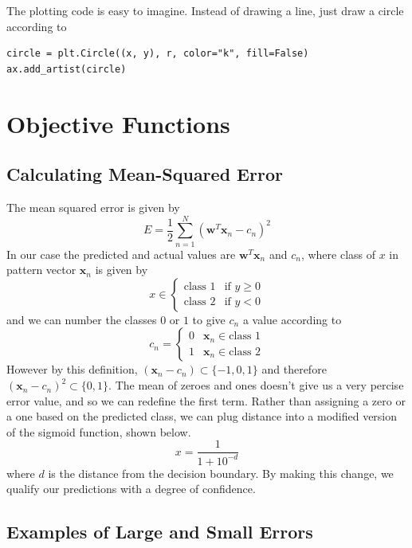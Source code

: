 \documentclass[letterpaper]{article}
\begin{document}
The plotting code is easy to imagine. Instead of drawing a line, just draw
a circle according to
\begin{verbatim}
circle = plt.Circle((x, y), r, color="k", fill=False)
ax.add_artist(circle)
\end{verbatim}

\section{Objective Functions}

\subsection{Calculating Mean-Squared Error}

The mean squared error is given by
\begin{equation*}
E = \frac{1}{2}\sum_{n=1}^N\left(\boldsymbol{w}^T\boldsymbol{x}_n-c_n\right)^2
\end{equation*}
In our case the predicted and actual values are $\boldsymbol{w}^T\boldsymbol{x}_n$
and $c_n$, where class of $x$ in pattern vector $\boldsymbol{x}_n$ is given by
\[
    x \in
    \begin{cases}
    \text{class 1} & \text{if } y\geq 0\\
    \text{class 2} & \text{if } y < 0
    \end{cases}
\]
and we can number the classes $0$ or $1$ to give $c_n$ a value according to
\[
    c_n =
    \begin{cases}
    0 & \boldsymbol{x}_n \in \text{class 1}\\
    1 & \boldsymbol{x}_n \in \text{class 2}
    \end{cases}
\]
However by this definition, $(\boldsymbol{x}_n-c_n)\subset \{-1,0,1\}$ and
therefore $(\boldsymbol{x}_n-c_n)^2\subset \{0,1\}$. The mean of zeroes and
ones doesn't give us a very percise error value, and so we can redefine the
first term. Rather than assigning a zero or a one based on the predicted class,
we can plug distance into a modified version of the sigmoid function, shown
below.
\begin{equation*}
x = \frac{1}{1+10^{-d}}
\end{equation*}
where $d$ is the distance from the decision boundary. By making this change,
we qualify our predictions with a degree of confidence.
 
\subsection{Examples of Large and Small Errors}
\end{document}
